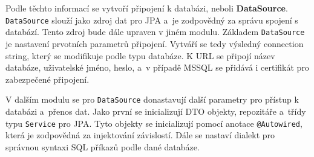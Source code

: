 Podle těchto informací se vytvoří připojení k databázi, neboli \textbf{DataSource}.
\texttt{DataSource} slouží jako zdroj dat pro JPA a~je zodpovědný za správu spojení s databází.
Tento zdroj bude dále upraven v jiném modulu.
Základem \texttt{DataSource} je nastavení prvotních parametrů připojení.
Vytváří se tedy výsledný connection string, který se modifikuje podle typu databáze.
K URL se připojí název databáze, uživatelské jméno, heslo, a~v případě MSSQL se přidává i certifikát pro zabezpečené připojení.

V dalším modulu se pro \texttt{DataSource} donastavují další parametry pro přístup k databázi a~přenos dat.
Jako první se inicializují DTO objekty, repozitáře a~třídy typu \texttt{Service} pro JPA.
Tyto objekty se inicializují pomocí anotace \texttt{@Autowired}, která je zodpovědná za injektování závislostí.
Dále se nastaví dialekt pro správnou syntaxi SQL příkazů podle dané databáze.

